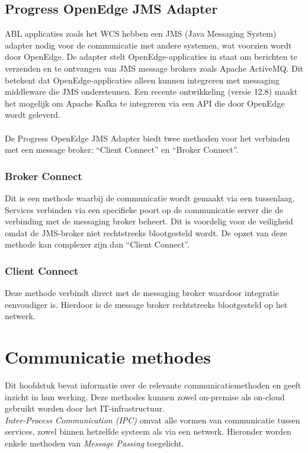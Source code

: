 \subsection{Progress OpenEdge JMS Adapter}
ABL applicaties zoals het WCS hebben een JMS (Java Messaging System) adapter nodig voor de communicatie met andere systemen, wat voorzien wordt door OpenEdge.
De adapter stelt OpenEdge-applicaties in staat om berichten te verzenden en te ontvangen van JMS message brokers zoals Apache ActiveMQ. 
Dit betekent dat OpenEdge-applicaties alleen kunnen integreren met messaging middleware die JMS ondersteunen. 
Een recente ontwikkeling (versie 12.8) maakt het mogelijk om Apache Kafka te integreren via een API die door OpenEdge wordt geleverd.
\\\\
De Progress OpenEdge JMS Adapter biedt twee methoden voor het verbinden met een message broker: ``Client Connect'' en  ``Broker Connect''.
\subsubsection{Broker Connect}
Dit is een methode waarbij de communicatie wordt gemaakt via een tussenlaag. Services verbinden via een specifieke poort op de communicatie server
die de verbinding met de messaging broker beheert. Dit is voordelig voor de veiligheid omdat de JMS-broker niet rechtstreeks blootgesteld wordt.
De opzet van deze methode kan complexer zijn dan ``Client Connect''.

\subsubsection{Client Connect}
Deze methode verbindt direct met de messaging broker waardoor integratie eenvoudiger is. 
Hierdoor is de message broker rechtstreeks blootgesteld op het netwerk.

\section{Communicatie methodes}
Dit hoofdstuk bevat informatie over de relevante communicatiemethoden en geeft inzicht in hun werking.
Deze methodes kunnen zowel on-premise als on-cloud gebruikt worden door het IT-infrastructuur.
\\
\emph{Inter-Process Communication (IPC)} omvat alle vormen van communicatie tussen services, 
zowel binnen hetzelfde systeem als via een netwerk. 
Hieronder worden enkele methoden van \emph{Message Passing} toegelicht.

